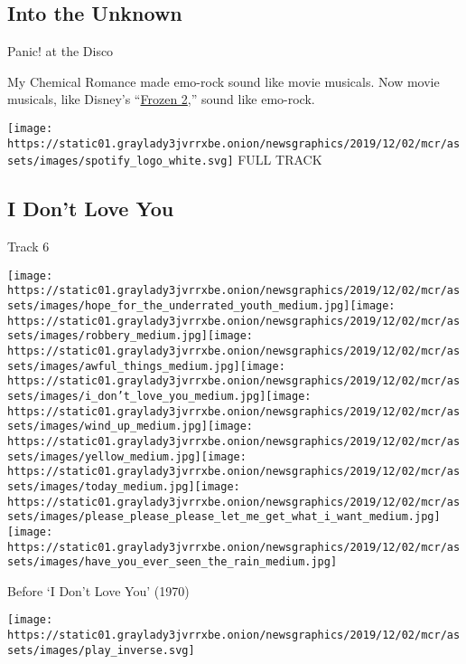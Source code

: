 \hypertarget{into-the-unknown}{%
\subsection{Into the Unknown}\label{into-the-unknown}}

Panic! at the Disco

My Chemical Romance made emo-rock sound like movie musicals. Now movie
musicals, like Disney's
``\href{https://www.nytimes3xbfgragh.onion/2019/11/29/movies/frozen-2-songs.html}{Frozen
2},'' sound like emo-rock.

\href{https://open.spotify.com/track/421eObjg0DTm2qajJl5OJm?si=wqNPvtJoSQSGsgklqBhMhA}{}

\texttt{[image: https://static01.graylady3jvrrxbe.onion/newsgraphics/2019/12/02/mcr/assets/images/spotify\_logo\_white.svg]}
FULL TRACK

\hypertarget{i-dont-love-you}{%
\subsection{I Don't Love You}\label{i-dont-love-you}}

Track 6

\texttt{[image: https://static01.graylady3jvrrxbe.onion/newsgraphics/2019/12/02/mcr/assets/images/hope\_for\_the\_underrated\_youth\_medium.jpg]}\texttt{[image: https://static01.graylady3jvrrxbe.onion/newsgraphics/2019/12/02/mcr/assets/images/robbery\_medium.jpg]}\texttt{[image: https://static01.graylady3jvrrxbe.onion/newsgraphics/2019/12/02/mcr/assets/images/awful\_things\_medium.jpg]}\texttt{[image: https://static01.graylady3jvrrxbe.onion/newsgraphics/2019/12/02/mcr/assets/images/i\_don't\_love\_you\_medium.jpg]}\texttt{[image: https://static01.graylady3jvrrxbe.onion/newsgraphics/2019/12/02/mcr/assets/images/wind\_up\_medium.jpg]}\texttt{[image: https://static01.graylady3jvrrxbe.onion/newsgraphics/2019/12/02/mcr/assets/images/yellow\_medium.jpg]}\texttt{[image: https://static01.graylady3jvrrxbe.onion/newsgraphics/2019/12/02/mcr/assets/images/today\_medium.jpg]}\texttt{[image: https://static01.graylady3jvrrxbe.onion/newsgraphics/2019/12/02/mcr/assets/images/please\_please\_please\_let\_me\_get\_what\_i\_want\_medium.jpg]}\texttt{[image: https://static01.graylady3jvrrxbe.onion/newsgraphics/2019/12/02/mcr/assets/images/have\_you\_ever\_seen\_the\_rain\_medium.jpg]}

Before `I Don't Love You' (1970)

\texttt{[image: https://static01.graylady3jvrrxbe.onion/newsgraphics/2019/12/02/mcr/assets/images/play\_inverse.svg]}

